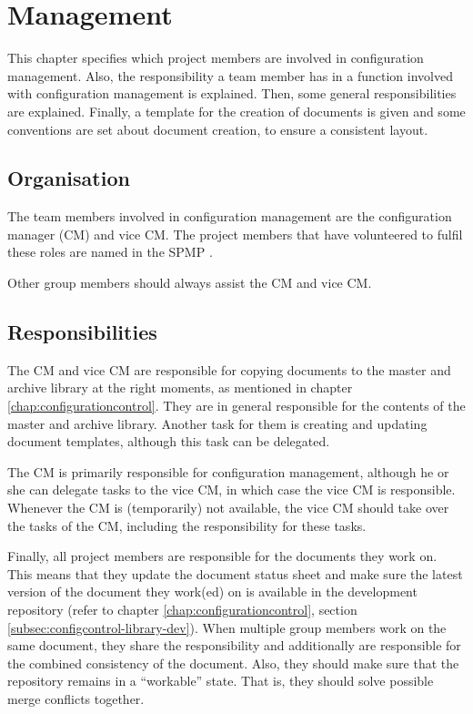 \chapter{Management}
\label{chap:management}
This chapter specifies which project members are involved in configuration management. Also, the responsibility a team member has in a function involved with configuration management is explained. Then, some general responsibilities are explained. Finally, a template for the creation of documents is given and some conventions are set about document creation, to ensure a consistent layout.

\section{Organisation}
The team members involved in configuration management are the configuration manager (CM) and vice CM. The project members that have volunteered to fulfil these roles are named in the SPMP \cite{spmp}.

Other group members should always assist the CM and vice CM.

\section{Responsibilities}
The CM and vice CM are responsible for copying documents to the master and archive library at the right moments, as mentioned in chapter \ref{chap:configurationcontrol}. They are in general responsible for the contents of the master and archive library. Another task for them is creating and updating document templates, although this task can be delegated.

The CM is primarily responsible for configuration management, although he or she can delegate tasks to the vice CM, in which case the vice CM is responsible. Whenever the CM is (temporarily) not available, the vice CM should take over the tasks of the CM, including the responsibility for these tasks.

Finally, all project members are responsible for the documents they work on. This means that they update the document status sheet and make sure the latest version of the document they work(ed) on is available in the development repository (refer to chapter \ref{chap:configurationcontrol}, section \ref{subsec:configcontrol-library-dev}). When multiple group members work on the same document, they share the responsibility and additionally are responsible for the combined consistency of the document. Also, they should make sure that the repository remains in a ``workable'' state. That is, they should solve possible merge conflicts together.

